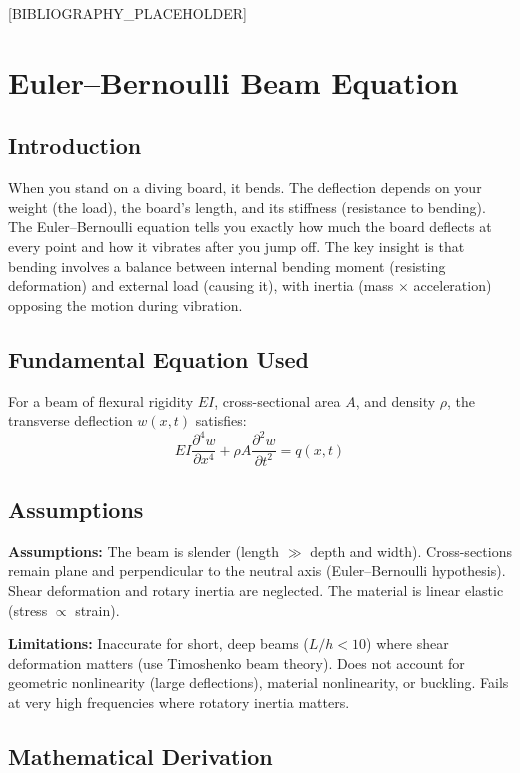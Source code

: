 \documentclass[11pt,openright]{book}
\begin{document}
[BIBLIOGRAPHY_PLACEHOLDER]


\chapter{Euler--Bernoulli Beam Equation}

\section*{Introduction}

When you stand on a diving board, it bends. The deflection depends on your weight (the load), the board's length, and its stiffness (resistance to bending). The Euler--Bernoulli equation tells you exactly how much the board deflects at every point and how it vibrates after you jump off. The key insight is that bending involves a balance between internal bending moment (resisting deformation) and external load (causing it), with inertia (mass $\times$ acceleration) opposing the motion during vibration.
\section*{Fundamental Equation Used}

For a beam of flexural rigidity $EI$, cross-sectional area $A$, and density $\rho$, the transverse deflection $w(x,t)$ satisfies:
\[
EI\frac{\partial^4 w}{\partial x^4} + \rho A \frac{\partial^2 w}{\partial t^2} = q(x,t)
\]
\section*{Assumptions}

\textbf{Assumptions:} The beam is slender (length $\gg$ depth and width). Cross-sections remain plane and perpendicular to the neutral axis (Euler--Bernoulli hypothesis). Shear deformation and rotary inertia are neglected. The material is linear elastic (stress $\propto$ strain).


\textbf{Limitations:} Inaccurate for short, deep beams ($L/h < 10$) where shear deformation matters (use Timoshenko beam theory). Does not account for geometric nonlinearity (large deflections), material nonlinearity, or buckling. Fails at very high frequencies where rotatory inertia matters.


\section*{Mathematical Derivation}
\end{document}
